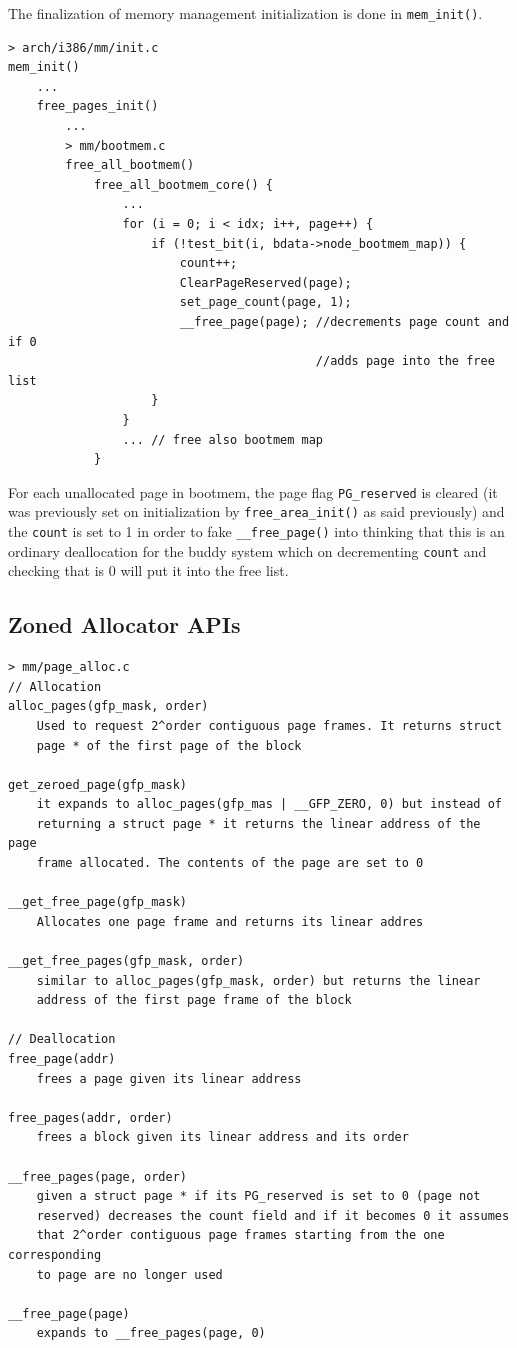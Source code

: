 \documentclass[twoside]{article}
\begin{document}
The finalization of memory management initialization is done in
\texttt{mem_init()}.

\begin{verbatim}
> arch/i386/mm/init.c
mem_init()
    ...
    free_pages_init()
        ...
        > mm/bootmem.c
        free_all_bootmem()
            free_all_bootmem_core() {
                ...
                for (i = 0; i < idx; i++, page++) {
                    if (!test_bit(i, bdata->node_bootmem_map)) {
                        count++;
                        ClearPageReserved(page);
                        set_page_count(page, 1);
                        __free_page(page); //decrements page count and if 0
                                           //adds page into the free list
                    }
                }
                ... // free also bootmem map
            }
\end{verbatim}

For each unallocated page in bootmem, the page flag \texttt{PG_reserved} is
cleared (it was previously set on initialization by
\texttt{free_area_init()} as said previously) and the \texttt{count} is set to 1
in order to fake \texttt{__free_page()} into thinking that this is an ordinary
deallocation for the buddy system which on decrementing \texttt{count} and
checking that is 0 will put it into the free list.

\subsection{Zoned Allocator APIs}

\begin{verbatim}
> mm/page_alloc.c
// Allocation
alloc_pages(gfp_mask, order)
    Used to request 2^order contiguous page frames. It returns struct
    page * of the first page of the block

get_zeroed_page(gfp_mask)
    it expands to alloc_pages(gfp_mas | __GFP_ZERO, 0) but instead of
    returning a struct page * it returns the linear address of the page
    frame allocated. The contents of the page are set to 0

__get_free_page(gfp_mask)
    Allocates one page frame and returns its linear addres

__get_free_pages(gfp_mask, order)
    similar to alloc_pages(gfp_mask, order) but returns the linear
    address of the first page frame of the block

// Deallocation
free_page(addr)
    frees a page given its linear address

free_pages(addr, order)
    frees a block given its linear address and its order

__free_pages(page, order)
    given a struct page * if its PG_reserved is set to 0 (page not
    reserved) decreases the count field and if it becomes 0 it assumes
    that 2^order contiguous page frames starting from the one corresponding
    to page are no longer used

__free_page(page)
    expands to __free_pages(page, 0)
\end{verbatim}
\end{document}
